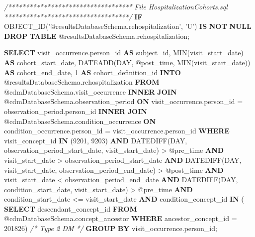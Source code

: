 \documentclass[]{article}
\newenvironment{Shaded}{\begin{snugshade}}{\end{snugshade}}
\newcommand{\KeywordTok}[1]{\textcolor[rgb]{0.13,0.29,0.53}{\textbf{#1}}}
\newcommand{\DataTypeTok}[1]{\textcolor[rgb]{0.13,0.29,0.53}{#1}}
\newcommand{\DecValTok}[1]{\textcolor[rgb]{0.00,0.00,0.81}{#1}}
\newcommand{\StringTok}[1]{\textcolor[rgb]{0.31,0.60,0.02}{#1}}
\newcommand{\CommentTok}[1]{\textcolor[rgb]{0.56,0.35,0.01}{\textit{#1}}}
\newcommand{\FunctionTok}[1]{\textcolor[rgb]{0.00,0.00,0.00}{#1}}
\newcommand{\NormalTok}[1]{#1}
\begin{document}
\begin{Shaded}
\begin{Highlighting}[]
\CommentTok{/***********************************}
\CommentTok{File HospitalizationCohorts.sql }
\CommentTok{***********************************/}
\KeywordTok{IF}\NormalTok{ OBJECT_ID(}\StringTok{'@resultsDatabaseSchema.rehospitalization'}\NormalTok{, }\StringTok{'U'}\NormalTok{) }\KeywordTok{IS} \KeywordTok{NOT} \KeywordTok{NULL}
\KeywordTok{DROP} \KeywordTok{TABLE}\NormalTok{ @resultsDatabaseSchema.rehospitalization;}

\KeywordTok{SELECT}\NormalTok{ visit_occurrence.person_id }\KeywordTok{AS}\NormalTok{ subject_id,}
\FunctionTok{MIN}\NormalTok{(visit_start_date) }\KeywordTok{AS}\NormalTok{ cohort_start_date,}
\NormalTok{DATEADD(}\DataTypeTok{DAY}\NormalTok{, @post_time, }\FunctionTok{MIN}\NormalTok{(visit_start_date)) }\KeywordTok{AS}\NormalTok{ cohort_end_date,}
\DecValTok{1} \KeywordTok{AS}\NormalTok{ cohort_definition_id}
\KeywordTok{INTO}\NormalTok{ @resultsDatabaseSchema.rehospitalization}
\KeywordTok{FROM}\NormalTok{ @cdmDatabaseSchema.visit_occurrence}
\KeywordTok{INNER} \KeywordTok{JOIN}\NormalTok{ @cdmDatabaseSchema.observation_period}
\KeywordTok{ON}\NormalTok{ visit_occurrence.person_id = observation_period.person_id}
\KeywordTok{INNER} \KeywordTok{JOIN}\NormalTok{ @cdmDatabaseSchema.condition_occurrence}
\KeywordTok{ON}\NormalTok{ condition_occurrence.person_id = visit_occurrence.person_id }
\KeywordTok{WHERE}\NormalTok{ visit_concept_id }\KeywordTok{IN}\NormalTok{ (}\DecValTok{9201}\NormalTok{, }\DecValTok{9203}\NormalTok{)}
\KeywordTok{AND}\NormalTok{ DATEDIFF(}\DataTypeTok{DAY}\NormalTok{, observation_period_start_date, visit_start_date) > @pre_time}
\KeywordTok{AND}\NormalTok{ visit_start_date > observation_period_start_date}
\KeywordTok{AND}\NormalTok{ DATEDIFF(}\DataTypeTok{DAY}\NormalTok{, visit_start_date, observation_period_end_date) > @post_time}
\KeywordTok{AND}\NormalTok{ visit_start_date < observation_period_end_date}
\KeywordTok{AND}\NormalTok{ DATEDIFF(}\DataTypeTok{DAY}\NormalTok{, condition_start_date, visit_start_date) > @pre_time}
\KeywordTok{AND}\NormalTok{ condition_start_date <= visit_start_date}
\KeywordTok{AND}\NormalTok{ condition_concept_id }\KeywordTok{IN}\NormalTok{ (}
\KeywordTok{SELECT}\NormalTok{ descendant_concept_id }
\KeywordTok{FROM}\NormalTok{ @cdmDatabaseSchema.concept_ancestor }
\KeywordTok{WHERE}\NormalTok{ ancestor_concept_id = }\DecValTok{201826}\NormalTok{) }\CommentTok{/* Type 2 DM */}
\KeywordTok{GROUP} \KeywordTok{BY}\NormalTok{ visit_occurrence.person_id;}


\end{Highlighting}
\end{Shaded}
\end{document}
